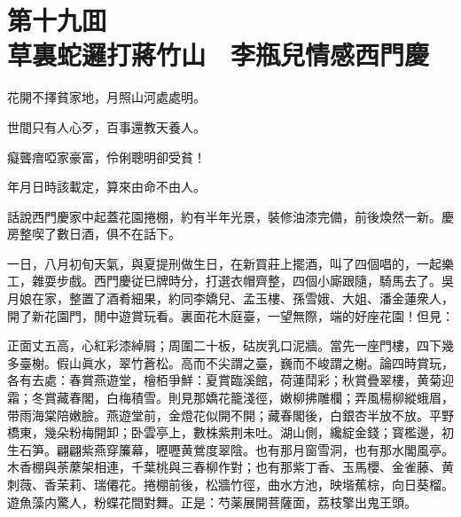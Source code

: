 
\chapter*{第十九囬　\\草裏蛇邏打蔣竹山　李瓶兒情感西門慶}


\begin{myquote}
花開不擇貧家地，月照山河處處明。

世間只有人心歹，百事還教天養人。

癡聾瘖啞家豪富，伶俐聰明卻受貧！

年月日時該載定，算來由命不由人。
\end{myquote}

話說西門慶家中起蓋花園捲棚，約有半年光景，裝修油漆完備，前後煥然一新。慶房整喫了數日酒，俱不在話下。

一日，八月初旬天氣，與夏提刑做生日，在新買莊上擺酒，叫了四個唱的，一起樂工，雜耍步戲。西門慶従巳牌時分，打選衣帽齊整，四個小廝跟隨，騎馬去了。吳月娘在家，整置了酒肴細果，約同李嬌兒、孟玉樓、孫雪娥、大姐、潘金蓮衆人，開了新花園門，閒中遊賞玩看。裏面花木庭臺，一望無際，端的好座花園！但見：

\begin{myquote}
正面丈五高，心紅彩漆綽屑；周圍二十板，𥑮炭乳口泥牆。當先一座門樓，四下幾多臺榭。假山眞水，翠竹蒼松。高而不尖謂之臺，巍而不峻謂之榭。論四時賞玩，各有去處：春賞燕遊堂，檜栢爭鮮：夏賞臨溪館，荷蓮鬦彩；秋賞疊翠樓，黄菊迎霜；冬賞藏春閣，白梅積雪。則見那嬌花籠淺徑，嫩柳拂雕欄；弄風楊柳縱蛾眉，带雨海棠陪嫩臉。燕遊堂前，金燈花似開不開；藏春閣後，白銀杏半放不放。平野橋東，幾朵粉梅開卸；卧雲亭上，數株紫荆未吐。湖山側，纔綻金錢；寳檻邊，初生石笋。翩翩紫燕穿簾幕，嚦嚦黄鶯度翠陰。也有那月窗雪洞，也有那水閣風亭。木香棚與荼䕷架相連，千葉桃與三春柳作對；也有那紫丁香、玉馬櫻、金雀藤、黄刺薇、香茉莉、瑞僊花。捲棚前後，松牆竹徑，曲水方池，映堦蕉棕，向日葵榴。遊魚藻内驚人，粉蝶花間對舞。正是：芍薬展開菩薩面，荔枝擎出鬼王頭。
\end{myquote}

